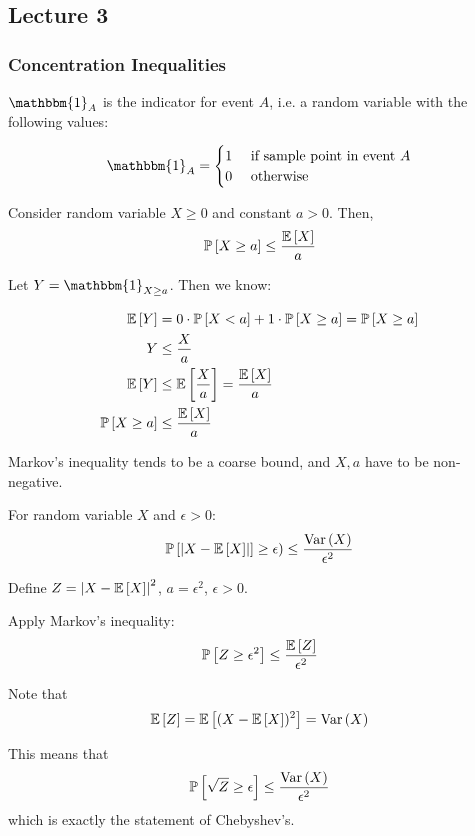 \subsection{Lecture 3}
\subsubsection{Concentration Inequalities}

\begin{definition}
    $\mathbbm{1}_A$
    is the indicator for event $A$, i.e. a random variable with the following values:

    \[ \mathbbm{1}_A = 
    \begin{cases}
    1 & \text{ if sample point in event $A$} \\
    0 & \text{ otherwise}
    \end{cases} \]
\end{definition}

\begin{theorem} 
    Consider random variable $X \geq 0$ and constant $a > 0$. Then,
    \[ \mathbb{P}\left[ X \geq a \right] \leq \frac{\mathbb{E}\left[ X \right]}{a} \]
\begin{proof*}
    Let $Y = \mathbbm{1}_{X \geq a}$. Then we know:

    \begin{align*}
        \mathbb{E}\left[ Y \right] &= 0 \cdot \mathbb{P}\left[ X < a \right] + 1 \cdot \mathbb{P}\left[ X \geq a \right] = \mathbb{P}\left[ X \geq a \right] \\
        Y &\leq \frac{X}{a} \\
        \mathbb{E}\left[ Y \right] &\leq \mathbb{E}\left[ \frac{X}{a} \right] = \frac{\mathbb{E}\left[ X \right]}{a} \\
        \mathbb{P}\left[ X \geq a \right] &\leq \frac{\mathbb{E}\left[ X \right]}{a}
    \end{align*}
\end{proof*}
\end{theorem}


Markov's inequality tends to be a coarse bound, and $X, a$ have to be non-negative.

\begin{theorem} 
    For random variable $X$ and $\epsilon > 0$:
    \[ \mathbb{P}\left[ \abs{X - \mathbb{E}\left[ X \right]} \right] \geq \epsilon) \leq \frac{\text{Var}\left( X \right)}{\epsilon^2} \]

    Define $Z = \abs{X - \mathbb{E}\left[ X \right]}^2$, $a = \epsilon^2$, $\epsilon > 0$.

    \begin{proof*}
    Apply Markov's inequality:
    \[ \mathbb{P}\left[ Z \geq \epsilon^2 \right] \leq \frac{\mathbb{E}\left[ Z \right]}{\epsilon^2} \]

    Note that \[\mathbb{E}\left[ Z \right] = \mathbb{E}\left[ (X - \mathbb{E}\left[ X \right])^2 \right] = \text{Var}\left( X \right) \]

    This means that \[ \mathbb{P}\left[ \sqrt{Z} \geq \epsilon \right] \leq \frac{\text{Var}\left( X \right)}{\epsilon^2} \]
    which is exactly the statement of Chebyshev's.
    \end{proof*}
\end{theorem}

